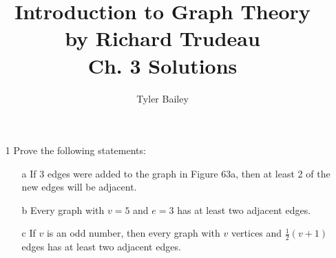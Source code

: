 \documentclass{article}
\begin{document}
\title{%
  Introduction to Graph Theory \\
  \large by Richard Trudeau \\
   Ch. 3 Solutions}
   \author{Tyler Bailey}
\maketitle

\begin{enumerate}
	\item[1] Prove the following statements:
	
	\begin{enumerate}
		\item[a] If 3 edges were added to the graph in Figure 63a, then at least 2 of the new edges will be adjacent.
		\item[b] Every graph with $v = 5$ and $e = 3$ has at least two adjacent edges.
		\item[c] If $v$ is an odd number, then every graph with $v$ vertices and $\frac{1}{2}(v + 1)$ edges has at least two adjacent edges.
	\end{enumerate}
	
\end{enumerate}
\end{document}
